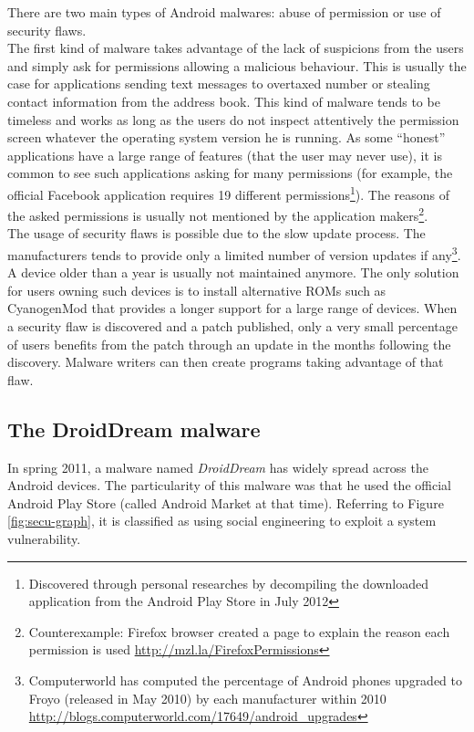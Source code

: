 There are two main types of Android malwares: abuse of permission or use of security flaws.\\

The first kind of malware takes advantage of the lack of suspicions from the users and simply ask for permissions allowing a malicious behaviour.
This is usually the case for applications sending text messages to overtaxed number or stealing contact information from the address book.
This kind of malware tends to be timeless and works as long as the users do not inspect attentively the permission screen whatever the operating system version he is running.
As some ``honest'' applications have a large range of features (that the user may never use), it is common to see such applications asking for many permissions (for example, the official Facebook application requires 19 different permissions\footnote{Discovered through personal researches by decompiling the downloaded application from the Android Play Store in July 2012}).
The reasons of the asked permissions is usually not mentioned by the application makers\footnote{Counterexample: Firefox browser created a page to explain the reason each permission is used \url{http://mzl.la/FirefoxPermissions}}.\\

The usage of security flaws is possible due to the slow update process.
The manufacturers tends to provide only a limited number of version updates if any\footnote{Computerworld has computed the percentage of Android phones upgraded to Froyo (released in May 2010) by each manufacturer within 2010 \url{http://blogs.computerworld.com/17649/android_upgrades}}.
A device older than a year is usually not maintained anymore.
The only solution for users owning such devices is to install alternative ROMs such as CyanogenMod that provides a longer support for a large range of devices.
When a security flaw is discovered and a patch published, only a very small percentage of users benefits from the patch through an update in the months following the discovery.
Malware writers can then create programs taking advantage of that flaw.\\

\subsection{The DroidDream malware}

In spring 2011, a malware named \emph{DroidDream} has widely spread across the Android devices.
The particularity of this malware was that he used the official Android Play Store (called Android Market at that time).
Referring to Figure \ref{fig:secu-graph}, it is classified as using social engineering to exploit a system vulnerability.\\

